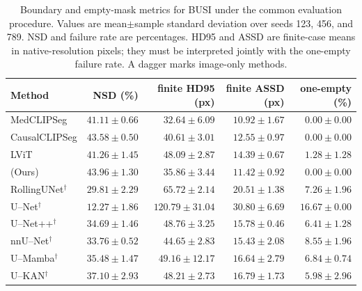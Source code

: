 \begin{table}[htbp]
\centering
\caption{Boundary and empty-mask metrics for BUSI under the common evaluation procedure. Values are mean$\pm$sample standard deviation over seeds 123, 456, and 789. NSD and failure rate are percentages. HD95 and ASSD are finite-case means in native-resolution pixels; they must be interpreted jointly with the one-empty failure rate. A dagger marks image-only methods.}
\label{tab:supp_boundary_medclipseg_busi}
\footnotesize
\setlength{\tabcolsep}{4.0pt}
\begin{tabular}{@{}lrrrr@{}}
\toprule
Method & NSD (\%) & finite HD95 (px) & finite ASSD (px) & one-empty (\%) \\
\midrule
MedCLIPSeg & $41.11\pm0.66$ & $32.64\pm6.09$ & $10.92\pm1.67$ & $0.00\pm0.00$ \\
CausalCLIPSeg & $43.58\pm0.50$ & $40.61\pm3.01$ & $12.55\pm0.97$ & $0.00\pm0.00$ \\
LViT & $41.26\pm1.45$ & $48.09\pm2.87$ & $14.39\pm0.67$ & $1.28\pm1.28$ \\
\methodname{} (Ours) & $43.96\pm1.30$ & $35.86\pm3.44$ & $11.42\pm0.92$ & $0.00\pm0.00$ \\
RollingUNet$^\dagger$ & $29.81\pm2.29$ & $65.72\pm2.14$ & $20.51\pm1.38$ & $7.26\pm1.96$ \\
U--Net$^\dagger$ & $12.27\pm1.86$ & $120.79\pm31.04$ & $30.80\pm6.69$ & $16.67\pm0.00$ \\
U--Net++$^\dagger$ & $34.69\pm1.46$ & $48.76\pm3.25$ & $15.78\pm0.46$ & $6.41\pm1.28$ \\
nnU--Net$^\dagger$ & $33.76\pm0.52$ & $44.65\pm2.83$ & $15.43\pm2.08$ & $8.55\pm1.96$ \\
U--Mamba$^\dagger$ & $35.48\pm1.47$ & $49.16\pm12.17$ & $16.64\pm2.79$ & $6.84\pm0.74$ \\
U--KAN$^\dagger$ & $37.10\pm2.93$ & $48.21\pm2.73$ & $16.79\pm1.73$ & $5.98\pm2.96$ \\
\bottomrule
\end{tabular}
\end{table}

